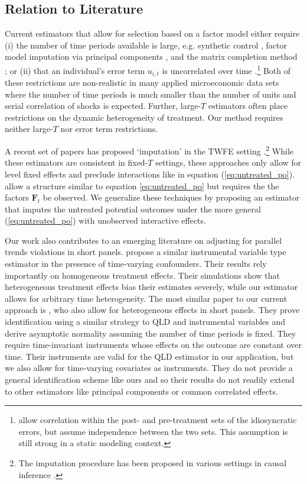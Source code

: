 \documentclass[12pt]{article}
\begin{document}
\subsection*{Relation to Literature}

Current estimators that allow for selection based on a factor model either require (i) the number of time periods available is large, e.g. synthetic control \citep{abadie2021using}, factor model imputation via principal components \citep{Gobillon_Magnac_2016,xu2017generalized,Bai_Ng_2021}, and the matrix completion method  \citep{Athey_et_al_2021,fernandez2021low}; or (ii) that an individual's error term $u_{i,t}$ is uncorrelated over time \citep{Feng_2020,Imbens_Kallus_Mao_2021}.\footnote{\citet{Imbens_Kallus_Mao_2021} allow correlation within the post- and pre-treatment sets of the idiosyncratic errors, but assume independence between the two sets. This assumption is still strong in a static modeling context.} Both of these restrictions are non-realistic in many applied microeconomic data sets where the number of time periods is much smaller than the number of units and serial correlation of shocks is expected. Further, large-$T$ estimators often place restrictions on the dynamic heterogeneity of treatment. Our method requires neither large-$T$ nor error term restrictions.

A recent set of papers has proposed `imputation' in the TWFE setting \citep{Borusyak_Jaravel_Spiess_2021,Gardner_2021,Wooldridge_2021}.\footnote{The imputation procedure has been proposed in various settings in causal inference \citep{imbens2015causal}.}
While these estimators are consistent in fixed-$T$ settings, these approaches only allow for level fixed effects and preclude interactions like in equation (\ref{eq:untreated_po}). \citet{Borusyak_Jaravel_Spiess_2021} allow a structure similar to equation \eqref{eq:untreated_po} but requires the the factors $\bm{F}_t$ be observed. We generalize these techniques by proposing an estimator that imputes the untreated potential outcomes under the more general (\ref{eq:untreated_po}) with unobserved interactive effects.

Our work also contributes to an emerging literature on adjusting for parallel trends violations in short panels. \citet{freyaldenhoven2019pre} propose a similar instrumental variable type estimator in the presence of time-varying confounders. Their results rely importantly on homogeneous treatment effects. Their simulations show that heterogeneous treatment effects bias their estimates severely, while our estimator allows for arbitrary time heterogeneity. The most similar paper to our current approach is \citet{Callaway_Karami_2020}, who also allow for heterogeneous effects in short panels. They prove identification using a similar strategy to QLD and instrumental variables and derive asymptotic normality assuming the number of time periods is fixed. They require time-invariant instruments whose effects on the outcome are constant over time. Their instruments are valid for the QLD estimator in our application, but we also allow for time-varying covariates as instruments. They do not provide a general identification scheme like ours and so their results do not readily extend to other estimators like principal components or common correlated effects.
\end{document}
